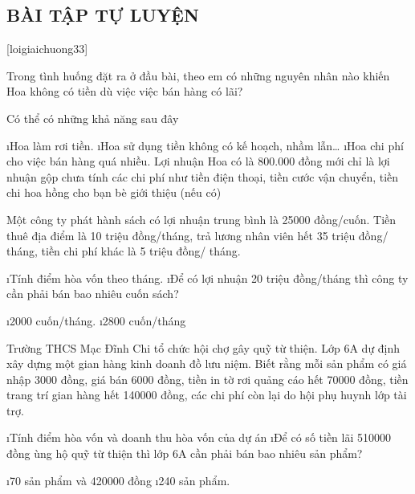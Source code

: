\subsection{BÀI TẬP TỰ LUYỆN}
[loigiaichuong33]
\begin{bt}
	Trong tình huống đặt ra ở đầu bài, theo em có những nguyên nhân nào khiến Hoa không có tiền dù việc việc bán hàng có lãi?
	\begin{loigiaichuong33}
		Có thể có những khả năng sau đây
		\begin{enumerate}[--,leftmargin=*]
			\i Hoa làm rơi tiền.
			\i Hoa sử dụng tiền không có kế hoạch, nhầm lẫn…
			\i Hoa chi phí cho việc bán hàng quá nhiều. Lợi nhuận Hoa có là 800.000 đồng mới chỉ là lợi nhuận gộp chưa tính các chi phí như tiền điện thoại, tiền cước vận chuyển, tiền chi hoa hồng cho bạn bè giới thiệu (nếu có)
		\end{enumerate}
	\end{loigiaichuong33}
\end{bt}
\begin{bt}
	Một công ty phát hành sách có lợi nhuận trung bình là 25000 đồng/cuốn. Tiền thuê địa điểm là 10 triệu đồng/tháng, trả lương nhân viên hết 35 triệu đồng/ tháng, tiền chi phí khác là 5 triệu đồng/ tháng.
	\begin{enumerate}[a),leftmargin=*]
		\i Tính điểm hòa vốn theo tháng.
		\i Để có lợi nhuận 20 triệu đồng/tháng thì công ty cần phải bán bao nhiêu cuốn sách?
	\end{enumerate}
	\begin{loigiaichuong33}
		\begin{enumerate}[a),leftmargin=*]
			\i 2000 cuốn/tháng.
			\i 2800 cuốn/tháng
		\end{enumerate}
	\end{loigiaichuong33}
\end{bt}
\begin{bt}
	Trường THCS Mạc Đĩnh Chi tổ chức hội chợ gây quỹ từ thiện. Lớp 6A dự định xây dựng một gian hàng kinh doanh đồ lưu niệm. Biết rằng mỗi sản phẩm có giá nhập 3000 đồng, giá bán 6000 đồng, tiền in tờ rơi quảng cáo hết 70000 đồng, tiền trang trí gian hàng hết 140000 đồng, các chi phí còn lại do hội phụ huynh lớp tài trợ.
	\begin{enumerate}[a),leftmargin=*]
		\i Tính điểm hòa vốn và doanh thu hòa vốn của dự án
		\i Để có số tiền lãi 510000 đồng ùng hộ quỹ từ thiện thì lớp 6A cần phải bán bao nhiêu sản phẩm?
	\end{enumerate}
	\begin{loigiaichuong33}
		\begin{enumerate}[a),leftmargin=*]
			\i 70 sản phẩm và 420000 đồng
			\i 240 sản phẩm.
		\end{enumerate}
	\end{loigiaichuong33}
\end{bt}
